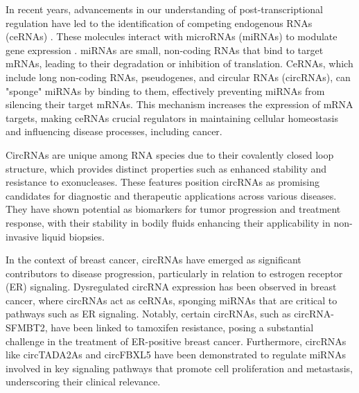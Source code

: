 In recent years, advancements in our understanding of post-transcriptional
regulation have led to the identification of competing endogenous RNAs (ceRNAs)
\supercite{salmena_cerna_2011,tay_multilayered_2014}.
These molecules interact with microRNAs (miRNAs) to modulate gene expression
\supercite{salmena_cerna_2011,li_long_2017}.
miRNAs are small, non-coding RNAs that bind to target mRNAs,
leading to their degradation or inhibition of
translation\supercite{salmena_cerna_2011,tay_multilayered_2014}.
CeRNAs, which include long non-coding RNAs, pseudogenes, and circular RNAs
(circRNAs), can "sponge" miRNAs by binding to them, effectively preventing
miRNAs from silencing their target
mRNAs\supercite{salmena_cerna_2011,poliseno_coding-independent_2010}.
This mechanism increases the expression of mRNA targets, making ceRNAs crucial
regulators in maintaining cellular homeostasis and influencing disease
processes, including cancer\supercite{salmena_cerna_2011,vo_landscape_2019}.

CircRNAs are unique among RNA species due to their covalently closed loop
structure, which provides distinct properties such as enhanced stability and
resistance to exonucleases\supercite{vo_landscape_2019}.
These features position circRNAs as promising candidates for diagnostic and
therapeutic applications across various
diseases\supercite{ma_circular_2020,hoque_exploring_2023,wilusz_circular_2017}.
They have shown potential as biomarkers for tumor progression and treatment
response\supercite{bao_prognostic_2020,ren_construction_2017}, with their
stability in bodily fluids enhancing their applicability in non-invasive liquid
biopsies\supercite{bao_prognostic_2020,zhang_circular_2018}.

In the context of breast cancer, circRNAs have emerged as significant
contributors to disease progression, particularly in relation to estrogen
receptor (ER) signaling.
Dysregulated circRNA expression has been observed in breast cancer, where
circRNAs act as ceRNAs, sponging miRNAs that are critical to pathways such as
ER signaling\supercite{nair_circular_2016,xu_circrna_2022}.
Notably, certain circRNAs, such as circRNA-SFMBT2, have been linked to
tamoxifen resistance, posing a substantial challenge in the treatment of
ER-positive breast cancer\supercite{li_circrna-sfmbt2_2023}.
Furthermore, circRNAs like circTADA2As and circFBXL5 have been demonstrated to
regulate miRNAs involved in key signaling pathways that promote cell
proliferation and metastasis, underscoring their clinical
relevance\supercite{xu_circtada2as_2019,gao_hsa_circrna_0006528_2019}.

